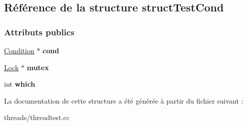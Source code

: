 \hypertarget{structstruct_test_cond}{}\subsection{Référence de la structure struct\+Test\+Cond}
\label{structstruct_test_cond}
\subsubsection*{Attributs publics}
\begin{DoxyCompactItemize}
\item 
\hypertarget{structstruct_test_cond_a220647550dfe2ddbc7a6854c245f431c}{}\label{structstruct_test_cond_a220647550dfe2ddbc7a6854c245f431c} 
\hyperlink{class_condition}{Condition} $\ast$ {\bfseries cond}
\item 
\hypertarget{structstruct_test_cond_a1c3b214086c6434e58d9edfed12e50dc}{}\label{structstruct_test_cond_a1c3b214086c6434e58d9edfed12e50dc} 
\hyperlink{class_lock}{Lock} $\ast$ {\bfseries mutex}
\item 
\hypertarget{structstruct_test_cond_a376f476ff75fb11b666f2d1ee26d8730}{}\label{structstruct_test_cond_a376f476ff75fb11b666f2d1ee26d8730} 
int {\bfseries which}
\end{DoxyCompactItemize}


La documentation de cette structure a été générée à partir du fichier suivant \+:\begin{DoxyCompactItemize}
\item 
threads/threadtest.\+cc\end{DoxyCompactItemize}
